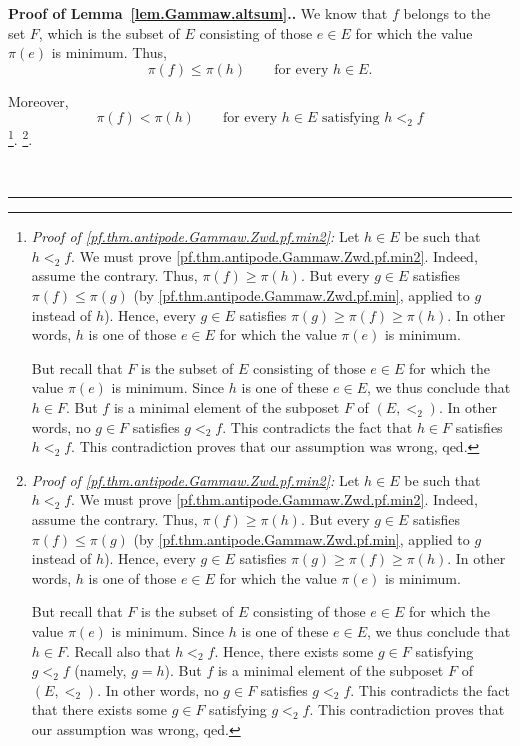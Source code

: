 \documentclass[numbers=enddot,12pt,final,onecolumn,notitlepage,abstracton]{scrartcl}
\theoremstyle{definition}
\newenvironment{proof}[1][Proof]{\noindent\textbf{#1.} }{\ \rule{0.5em}{0.5em}}
\newenvironment{verlong}{}{}
\newenvironment{vershort}{}{}
\begin{document}
\begin{proof}[Proof of Lemma~\ref{lem.Gammaw.altsum}.]
We know that $f$ belongs to the set $F$, which is the subset of $E$ consisting
of those $e\in E$ for which the value $\pi \left( e \right)$
is minimum. Thus,
\begin{equation}
\pi\left(  f\right)  \leq\pi\left(  h\right)  \qquad\text{for every }h\in
E.
\label{pf.thm.antipode.Gammaw.Zwd.pf.min}
\end{equation}


Moreover,
\begin{equation}
\pi\left(  f\right)  <\pi\left(  h\right)
\qquad\text{for every } h\in E \text{ satisfying } h<_{2}f
\label{pf.thm.antipode.Gammaw.Zwd.pf.min2}
\end{equation}
\begin{vershort}
\footnote{\textit{Proof of \eqref{pf.thm.antipode.Gammaw.Zwd.pf.min2}:}
Let $h \in E$ be such that $h <_2 f$. We must prove
\eqref{pf.thm.antipode.Gammaw.Zwd.pf.min2}.
Indeed, assume the contrary. Thus,
$\pi \left( f \right) \geq \pi \left( h \right)$.
But every $g \in E$ satisfies
$\pi \left( f \right) \leq \pi \left( g \right)$
(by \eqref{pf.thm.antipode.Gammaw.Zwd.pf.min}, applied to
$g$ instead of $h$). Hence, every $g \in E$ satisfies
$\pi \left( g \right) \geq \pi \left( f \right)
\geq \pi \left( h \right)$. In other words,
$h$ is one of those $e\in E$ for which the value
$\pi \left( e \right)$ is minimum.
\par
But recall that $F$ is the subset of $E$ consisting
of those $e \in E$ for which the value $\pi \left( e \right)$
is minimum.
Since $h$ is one of these $e \in E$, we thus conclude that $h \in F$.
But $f$ is a minimal element
of the subposet $F$ of $\left(E, <_2\right)$.
In other words, no $g\in F$ satisfies $g<_{2}f$.
This contradicts the fact that $h\in F$ satisfies $h <_2 f$.
This contradiction proves that our assumption was wrong, qed.}.
\end{vershort}
\begin{verlong}
\footnote{\textit{Proof of \eqref{pf.thm.antipode.Gammaw.Zwd.pf.min2}:}
Let $h \in E$ be such that $h <_2 f$. We must prove
\eqref{pf.thm.antipode.Gammaw.Zwd.pf.min2}.
Indeed, assume the contrary. Thus,
$\pi \left( f \right) \geq \pi \left( h \right)$.
But every $g \in E$ satisfies
$\pi \left( f \right) \leq \pi \left( g \right)$
(by \eqref{pf.thm.antipode.Gammaw.Zwd.pf.min}, applied to
$g$ instead of $h$). Hence, every $g \in E$ satisfies
$\pi \left( g \right) \geq \pi \left( f \right)
\geq \pi \left( h \right)$. In other words,
$h$ is one of those $e\in E$ for which the value
$\pi \left( e \right)$ is minimum.
\par
But recall that $F$ is the subset of $E$ consisting
of those $e \in E$ for which the value $\pi \left( e \right)$
is minimum.
Since $h$ is one of these $e \in E$, we thus conclude that $h \in F$.
Recall also that $h <_2 f$.
Hence, there exists some $g \in F$ satisfying $g <_2 f$
(namely, $g = h$).
But $f$ is a minimal element
of the subposet $F$ of $\left(E, <_2\right)$.
In other words, no $g\in F$ satisfies $g<_{2}f$.
This contradicts the fact that there exists some $g \in F$ satisfying
$g <_2 f$.
This contradiction proves that our assumption was wrong, qed.}.
\end{verlong}


\end{proof}
\end{document}
